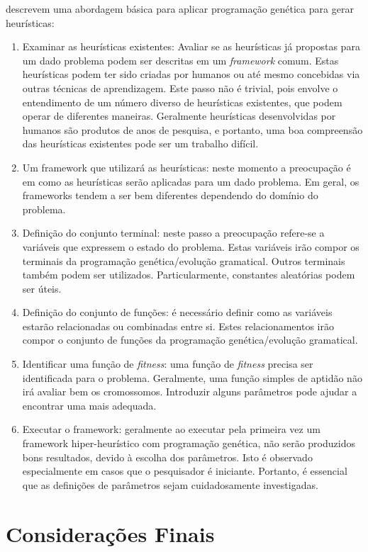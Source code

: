 \cite{burke2009exploring} descrevem uma abordagem básica para aplicar programação genética para gerar heurísticas:

\begin{enumerate}
	\item Examinar as heurísticas existentes: Avaliar se as heurísticas já propostas para um dado problema podem ser descritas em um \textit{framework} comum. Estas heurísticas podem ter sido criadas por humanos ou até mesmo concebidas via outras técnicas de aprendizagem. Este passo não é trivial, pois envolve o entendimento de um número diverso de heurísticas existentes, que podem operar de diferentes maneiras. Geralmente heurísticas desenvolvidas por humanos são produtos de anos de pesquisa, e portanto, uma boa compreensão das heurísticas existentes pode ser um trabalho difícil. 
	\item Um framework que utilizará as heurísticas: neste momento a preocupação é em como as heurísticas serão aplicadas para um dado problema. Em geral, os frameworks tendem a ser bem diferentes dependendo do domínio do problema. 
	\item Definição do conjunto terminal: neste passo a preocupação refere-se a variáveis que expressem o estado do problema. Estas variáveis irão compor os terminais da programação genética/evolução gramatical. Outros terminais também podem ser utilizados. Particularmente, constantes aleatórias podem ser úteis.
	\item Definição do conjunto de funções: é necessário definir como as variáveis estarão relacionadas ou combinadas entre si. Estes relacionamentos irão compor o conjunto de funções da programação genética/evolução gramatical. 
	\item Identificar uma função de \textit{fitness}: uma função de \textit{fitness} precisa ser identificada para o problema. Geralmente, uma função simples de aptidão não irá avaliar bem os cromossomos. Introduzir alguns parâmetros pode ajudar a encontrar uma mais adequada.
	\item Executar o framework: geralmente ao executar pela primeira vez um framework hiper-heurístico com programação genética, não serão produzidos bons resultados, devido à escolha dos parâmetros. Isto é observado especialmente em casos que o pesquisador é iniciante. Portanto, é essencial que as definições de parâmetros sejam cuidadosamente investigadas.
\end{enumerate}




\section{Considerações Finais}
\label{ReferencialTeorico:Conclusão}



